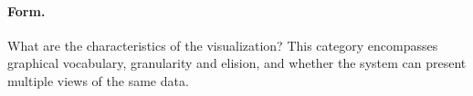 
\paragraph{Form.} What are the characteristics of the visualization? This
category encompasses graphical vocabulary, granularity and elision, and whether
the system can present multiple views of the same data.

